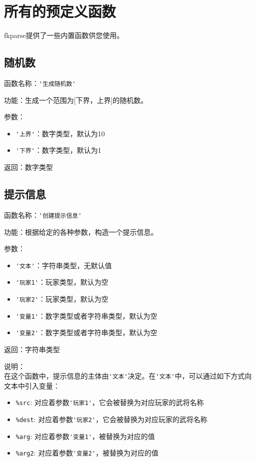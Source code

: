 \chapter{所有的预定义函数}

fkparse提供了一些内置函数供您使用。

\section{随机数}

函数名称：\verb|'生成随机数'|

功能：生成一个范围为[下界，上界]的随机数。

参数：

\begin{itemize}
  \item \verb|'上界'|：数字类型，默认为10
  \item \verb|'下界'|：数字类型，默认为1
\end{itemize}

返回：数字类型

\section{提示信息}

函数名称：\verb|'创建提示信息'|

功能：根据给定的各种参数，构造一个提示信息。

参数：

\begin{itemize}
  \item \verb|'文本'|：字符串类型，无默认值
  \item \verb|'玩家1'|：玩家类型，默认为空
  \item \verb|'玩家2'|：玩家类型，默认为空
  \item \verb|'变量1'|：数字类型或者字符串类型，默认为空
  \item \verb|'变量2'|：数字类型或者字符串类型，默认为空
\end{itemize}

返回：字符串类型

说明：\\

在这个函数中，提示信息的主体由\verb|'文本'|决定。在\verb|'文本'|中，可以通过如下方式向文本中引入变量：

\begin{itemize}
  \item \verb|%src|: 对应着参数\verb|'玩家1'|，它会被替换为对应玩家的武将名称
  \item \verb|%dest|: 对应着参数\verb|'玩家2'|，它会被替换为对应玩家的武将名称
  \item \verb|%arg|: 对应着参数\verb|'变量1'|，被替换为对应的值
  \item \verb|%arg2|: 对应着参数\verb|'变量2'|，被替换为对应的值
\end{itemize}

